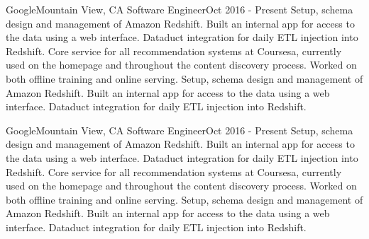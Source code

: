         \resumeSubheading
        {Google}{Mountain View, CA}
        {Software Engineer}{Oct 2016 - Present}
        \resumeItemListStart
            {Setup, schema design and management of Amazon Redshift. Built an internal app for access to the data using a web interface. Dataduct integration for daily ETL injection into Redshift.}
            {Core service for all recommendation systems at Coursesa, currently used on the homepage and throughout the content discovery process. Worked on both offline training and online serving.}
            {Setup, schema design and management of Amazon Redshift. Built an internal app for access to the data using a web interface. Dataduct integration for daily ETL injection into Redshift.}
        \resumeItemListEnd
  
        \resumeSubheading
        {Google}{Mountain View, CA}
        {Software Engineer}{Oct 2016 - Present}
        \resumeItemListStart
            {Setup, schema design and management of Amazon Redshift. Built an internal app for access to the data using a web interface. Dataduct integration for daily ETL injection into Redshift.}
            {Core service for all recommendation systems at Coursesa, currently used on the homepage and throughout the content discovery process. Worked on both offline training and online serving.}
            {Setup, schema design and management of Amazon Redshift. Built an internal app for access to the data using a web interface. Dataduct integration for daily ETL injection into Redshift.}
        \resumeItemListEnd
  
    \resumeSubHeadingListEnd